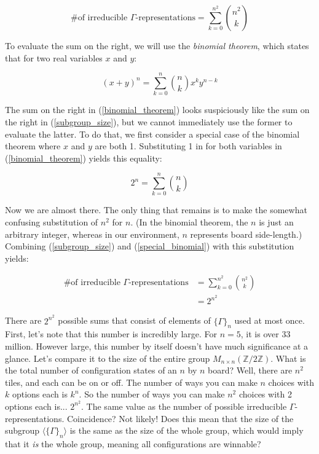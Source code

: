 \documentclass{article}[12pt]
\newcommand{\group}[1]{M_{#1 \times #1}(\mathbb{Z}/2\mathbb{Z})}
\newcommand{\subgroup}[1]{\langle\{\Gamma\}_{#1}\rangle}
\newcommand{\refx}[1]{(\ref{#1})}
\begin{document}
\begin{equation}
\label{subgroup_size}
\text{\# of irreducible $\Gamma$-representations} = \sum_{k = 0}^{n^2} {n^2 \choose k}
\end{equation}

To evaluate the sum on the right, we will use the \emph{binomial theorem}, which states that for two real variables $x$ and $y$:

\begin{equation}
\label{binomial_theorem}
(x + y)^n = \sum_{k = 0}^n {n \choose k}x^ky^{n - k}
\end{equation}

The sum on the right in \refx{binomial_theorem} looks suspiciously like the sum on the right in \refx{subgroup_size}, but we cannot immediately use the former to evaluate the latter.  To do that, we first consider a special case of the binomial theorem where $x$ and $y$ are both 1.  Substituting 1 in for both variables in \refx{binomial_theorem} yields this equality:

\begin{equation}
\label{special_binomial}
2^n = \sum_{k = 0}^n {n \choose k}
\end{equation}

Now we are almost there.  The only thing that remains is to make the somewhat confusing substitution of $n^2$ for $n$.  (In the binomial theorem, the $n$ is just an arbitrary integer, whereas in our environment, $n$ represents board side-length.)  Combining \refx{subgroup_size} and \refx{special_binomial} with this substitution yields:

\begin{equation}
\begin{aligned}
\text{\# of irreducible $\Gamma$-representations} &= \sum_{k = 0}^{n^2} {n^2 \choose k}\\
&= 2^{n^2}
\end{aligned}
\end{equation}

There are $2^{n^2}$ possible sums that consist of elements of $\{\Gamma\}_n$ used at most once.  First, let's note that this number is incredibly large.  For $n = 5$, it is over 33 million.  However large, this number by itself doesn't have much significance at a glance.  Let's compare it to the size of the entire group $\group{n}$.  What is the total number of configuration states of an $n$ by $n$ board?  Well, there are $n^2$ tiles, and each can be on or off.  The number of ways you can make $n$ choices with $k$ options each is $k^n$.  So the number of ways you can make $n^2$ choices with 2 options each is... $2^{n^2}$.  The same value as the number of possible irreducible $\Gamma$-representations.  Coincidence?  Not likely!  Does this mean that the size of the subgroup $\subgroup{n}$ is the same as the size of the whole group, which would imply that it \emph{is} the whole group, meaning all configurations are winnable?
\end{document}
